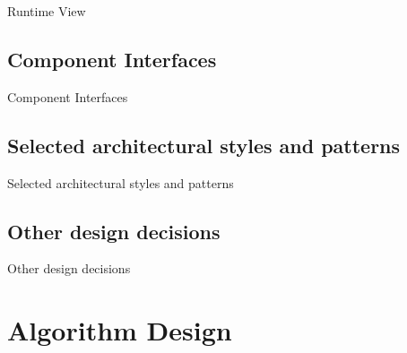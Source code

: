 \documentclass{../common/latex_classes/pdf_presentation}
\begin{document}
	\begin{frame}{Runtime View}
	\end{frame}
	
	\subsection{Component Interfaces}
		
	\begin{frame}{Component Interfaces}
	\end{frame}
	
	\subsection{Selected architectural styles and patterns}
	
	\begin{frame}{Selected architectural styles and patterns}
	\end{frame}
	
	\subsection{Other design decisions}
		
	\begin{frame}{Other design decisions}
	\end{frame}
	
	\section{Algorithm Design}
	
\end{document}
